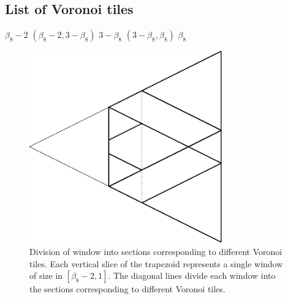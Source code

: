 \documentclass[text.tex]{subfiles}
\begin{document}
\subsection{List of Voronoi tiles}
$\beta_8-2$
$\left( \beta_8-2, 3-\beta_8 \right)$
$3-\beta_8$
$\left( 3-\beta_8, \beta_8 \right)$
$\beta_8$	

\begin{figure}[h!]
\centering
\includegraphics[width=0.74\textwidth]{img/1D/alpha}
\caption{Division of window into sections corresponding to different Voronoi tiles. Each vertical slice of the trapezoid represents a single window of size in $[\beta_8-2,1]$. The diagonal lines divide each window into the sections corresponding to different Voronoi tiles. }
\label{fig_8fold1DWindow}
\end{figure}
\end{document}
